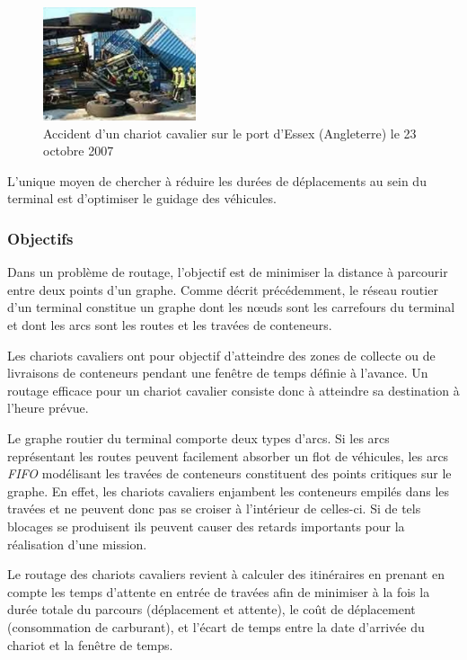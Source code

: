 \begin{figure}[ht]
 \begin{center}
 \includegraphics[width=0.4\textwidth]{chapitres/application/sc_crash.jpg}
 \caption{Accident d'un chariot cavalier sur le port d'Essex (Angleterre) le 23 octobre 2007}
 \label{fig:optTerminaux:scCrash}
 \end{center}
\end{figure}

L'unique moyen de chercher à réduire les durées de déplacements au sein du terminal est d'optimiser le guidage des véhicules. 

\subsubsection{Objectifs}
Dans un problème de routage, l'objectif est de minimiser la distance à parcourir entre deux points d'un graphe. 
Comme décrit précédemment, le réseau routier d'un terminal constitue un graphe dont les n\oe{}uds sont les carrefours du terminal et dont les arcs sont les routes et les travées de conteneurs. 

Les chariots cavaliers ont pour objectif d'atteindre des zones de collecte ou de livraisons de conteneurs pendant une fenêtre de temps définie à l'avance. Un routage efficace pour un chariot cavalier consiste donc à atteindre sa destination à l'heure prévue.

Le graphe routier du terminal comporte deux types d'arcs. Si les arcs représentant les routes peuvent facilement absorber un flot de véhicules, les arcs \textit{FIFO} modélisant les travées de conteneurs constituent des points critiques sur le graphe. 
En effet, les chariots cavaliers enjambent les conteneurs empilés dans les travées et ne peuvent donc pas se croiser à l'intérieur de celles-ci. 
Si de tels blocages se produisent ils peuvent causer des retards importants pour la réalisation d'une mission.

Le routage des chariots cavaliers revient à calculer des itinéraires en prenant en compte les temps d'attente en entrée de travées afin de minimiser à la fois la durée totale du parcours (déplacement et attente), le coût de déplacement (consommation de carburant), et l'écart de temps entre la date d'arrivée du chariot et la fenêtre de temps.


